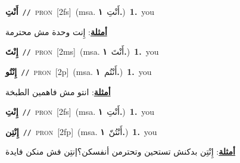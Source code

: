 \documentclass[10pt,a4paper,twoside]{article} %
\begin{document}
\begin{multicols}{2}
{\setlength\topsep{0pt}\textbf{\foreignlanguage{arabic}{أَنْتِ}}\ {\color{gray}\texttt{//}\color{black}}\ \textsc{pron}\ [2fs]\ \color{gray}(msa. \foreignlanguage{arabic}{أَنْتِ}~\foreignlanguage{arabic}{\textbf{١.}})\color{black}\ \textbf{1.}~you\  \begin{flushright}\color{gray}\foreignlanguage{arabic}{\textbf{\underline{\foreignlanguage{arabic}{أمثلة}}}: إِنت وحدة مش محترمة}\end{flushright}\color{black}} \vspace{2mm}

{\setlength\topsep{0pt}\textbf{\foreignlanguage{arabic}{إِنْتَ}}\ {\color{gray}\texttt{//}\color{black}}\ \textsc{pron}\ [2ms]\ \color{gray}(msa. \foreignlanguage{arabic}{أَنْتَ}~\foreignlanguage{arabic}{\textbf{١.}})\color{black}\ \textbf{1.}~you\ } \vspace{2mm}

{\setlength\topsep{0pt}\textbf{\foreignlanguage{arabic}{إِنْتُو}}\ {\color{gray}\texttt{//}\color{black}}\ \textsc{pron}\ [2p]\ \color{gray}(msa. \foreignlanguage{arabic}{أَنْتُم}~\foreignlanguage{arabic}{\textbf{١.}})\color{black}\ \textbf{1.}~you\  \begin{flushright}\color{gray}\foreignlanguage{arabic}{\textbf{\underline{\foreignlanguage{arabic}{أمثلة}}}: انتو مش فاهمين الطبخة}\end{flushright}\color{black}} \vspace{2mm}

{\setlength\topsep{0pt}\textbf{\foreignlanguage{arabic}{إِنْتِ}}\ {\color{gray}\texttt{//}\color{black}}\ \textsc{pron}\ [2fs]\ \color{gray}(msa. \foreignlanguage{arabic}{أَنْتِ}~\foreignlanguage{arabic}{\textbf{١.}})\color{black}\ \textbf{1.}~you\ } \vspace{2mm}

{\setlength\topsep{0pt}\textbf{\foreignlanguage{arabic}{إِنْتِن}}\ {\color{gray}\texttt{//}\color{black}}\ \textsc{pron}\ [2fp]\ \color{gray}(msa. \foreignlanguage{arabic}{أَنْتُنّ}~\foreignlanguage{arabic}{\textbf{١.}})\color{black}\ \textbf{1.}~you\  \begin{flushright}\color{gray}\foreignlanguage{arabic}{\textbf{\underline{\foreignlanguage{arabic}{أمثلة}}}: إِنْتِن بدكنش تستحين وتحترمن أنفسكن؟إنتِن فش منكن فايدة}\end{flushright}\color{black}} \vspace{2mm}


\end{multicols}
\end{document}
